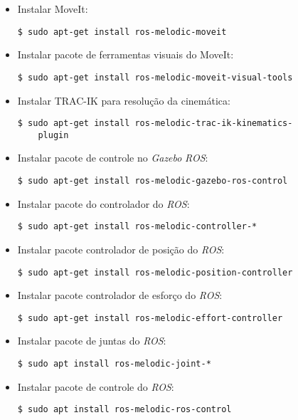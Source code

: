 \begin{itemize}
  \item Instalar MoveIt:
  \begin{lstlisting}[frame=single]
    $ sudo apt-get install ros-melodic-moveit
  \end{lstlisting}
  \item Instalar pacote de ferramentas visuais do MoveIt:
  \begin{lstlisting}[frame=single]
    $ sudo apt-get install ros-melodic-moveit-visual-tools
  \end{lstlisting}
  \item Instalar TRAC-IK para resolução da cinemática:
  \begin{lstlisting}[frame=single]
    $ sudo apt-get install ros-melodic-trac-ik-kinematics-
    plugin
  \end{lstlisting}
  \item Instalar pacote de controle no \textit{Gazebo} \textit{\acs{ROS}}:
  \begin{lstlisting}[frame=single]
    $ sudo apt-get install ros-melodic-gazebo-ros-control
  \end{lstlisting}
  \item Instalar pacote do controlador do \textit{\acs{ROS}}:
  \begin{lstlisting}[frame=single]
    $ sudo apt-get install ros-melodic-controller-*
  \end{lstlisting}
  \item Instalar pacote controlador de posição do \textit{\acs{ROS}}:
  \begin{lstlisting}[frame=single]
    $ sudo apt-get install ros-melodic-position-controller
  \end{lstlisting}
  \item Instalar pacote controlador de esforço do \textit{\acs{ROS}}:
  \begin{lstlisting}[frame=single]
    $ sudo apt-get install ros-melodic-effort-controller
  \end{lstlisting}
  \item Instalar pacote de juntas do \textit{\acs{ROS}}:
  \begin{lstlisting}[frame=single]
    $ sudo apt install ros-melodic-joint-*
  \end{lstlisting}
  \item Instalar pacote de controle do \textit{\acs{ROS}}:
  \begin{lstlisting}[frame=single]
    $ sudo apt install ros-melodic-ros-control
  \end{lstlisting}
\end{itemize}


